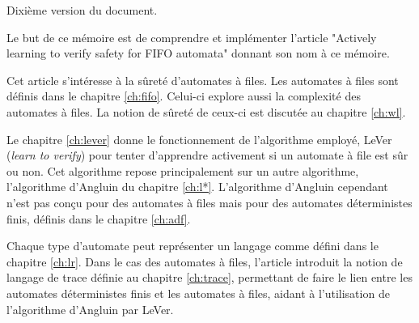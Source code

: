 Dixième version du document.

Le but de ce mémoire est de comprendre et implémenter l'article "Actively learning to verify safety for FIFO automata" \cite{Vardhan04} donnant son nom à ce mémoire.

Cet article s'intéresse à la sûreté d'automates à files. Les automates à files sont définis dans le chapitre \ref{ch:fifo}. Celui-ci explore aussi la complexité des automates à files. La notion de sûreté de ceux-ci est discutée au chapitre \ref{ch:wl}.

Le chapitre \ref{ch:lever} donne le fonctionnement de l'algorithme employé, LeVer (\emph{learn to verify}) pour tenter d'apprendre activement si un automate à file est sûr ou non. Cet algorithme repose principalement sur un autre algorithme, l'algorithme d'Angluin du chapitre \ref{ch:l*}. L'algorithme d'Angluin cependant n'est pas conçu pour des automates à files mais pour des automates déterministes finis, définis dans le chapitre \ref{ch:adf}.

Chaque type d'automate peut représenter un langage comme défini dans le chapitre \ref{ch:lr}. Dans le cas des automates à files, l'article \cite{Vardhan04} introduit la notion de langage de trace définie au chapitre \ref{ch:trace}, permettant de faire le lien entre les automates déterministes finis et les automates à files, aidant à l'utilisation de l'algorithme d'Angluin par LeVer.
